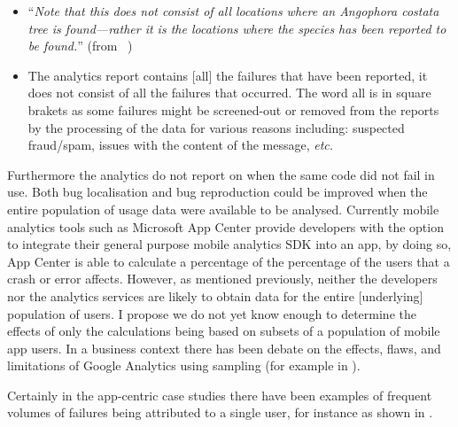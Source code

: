 \begin{itemize}
    \item``\textit{Note that this does not consist of all locations where an Angophora costata tree is found—rather it is the locations where the species has been reported to be found.}'' (from ~)
    \item The analytics report contains [all] the failures that have been reported, it does not consist of all the failures that occurred. The word all is in square brakets as some failures might be screened-out or removed from the reports by the processing of the data for various reasons including: suspected fraud/spam, issues with the content of the message, \emph{etc.}
\end{itemize}
\afterpage{\clearpage}

Furthermore the analytics do not report on when the same code did not fail in use. Both bug localisation and bug reproduction could be improved when the entire population of usage data were available to be analysed. Currently mobile analytics tools such as Microsoft App Center provide developers with the option to integrate their general purpose mobile analytics SDK into an app, by doing so, App Center is able to calculate a percentage of the percentage of the users that a crash or error affects. 
%
However, as mentioned previously, neither the developers nor the analytics services are likely to obtain data for the entire [underlying] population of users. I propose we do not yet know enough to determine the effects of only the calculations being based on subsets of a population of mobile app users. In a business context there has been debate on the effects, flaws, and limitations of Google Analytics using sampling (for example in ).

Certainly in the app-centric case studies there have been examples of frequent volumes of failures being attributed to a single user, for instance as shown in . 

